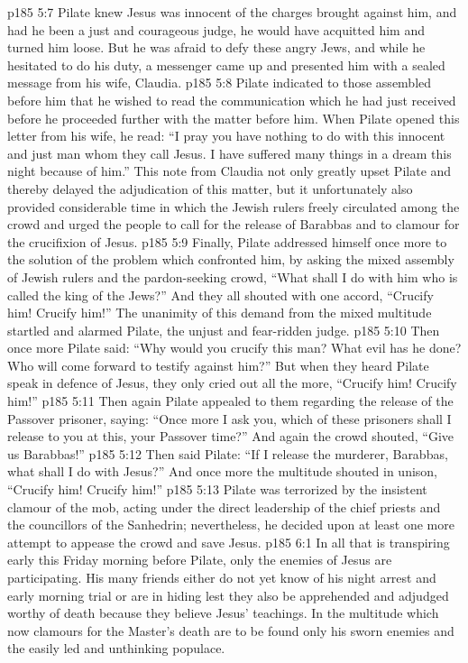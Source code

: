 \vs p185 5:7 Pilate knew Jesus was innocent of the charges brought against him, and had he been a just and courageous judge, he would have acquitted him and turned him loose. But he was afraid to defy these angry Jews, and while he hesitated to do his duty, a messenger came up and presented him with a sealed message from his wife, Claudia.
\vs p185 5:8 Pilate indicated to those assembled before him that he wished to read the communication which he had just received before he proceeded further with the matter before him. When Pilate opened this letter from his wife, he read: “I pray you have nothing to do with this innocent and just man whom they call Jesus. I have suffered many things in a dream this night because of him.” This note from Claudia not only greatly upset Pilate and thereby delayed the adjudication of this matter, but it unfortunately also provided considerable time in which the Jewish rulers freely circulated among the crowd and urged the people to call for the release of Barabbas and to clamour for the crucifixion of Jesus.
\vs p185 5:9 Finally, Pilate addressed himself once more to the solution of the problem which confronted him, by asking the mixed assembly of Jewish rulers and the pardon\hyp{}seeking crowd, “What shall I do with him who is called the king of the Jews?” And they all shouted with one accord, “Crucify him! Crucify him!” The unanimity of this demand from the mixed multitude startled and alarmed Pilate, the unjust and fear\hyp{}ridden judge.
\vs p185 5:10 Then once more Pilate said: “Why would you crucify this man? What evil has he done? Who will come forward to testify against him?” But when they heard Pilate speak in defence of Jesus, they only cried out all the more, “Crucify him! Crucify him!”
\vs p185 5:11 Then again Pilate appealed to them regarding the release of the Passover prisoner, saying: “Once more I ask you, which of these prisoners shall I release to you at this, your Passover time?” And again the crowd shouted, “Give us Barabbas!”
\vs p185 5:12 Then said Pilate: “If I release the murderer, Barabbas, what shall I do with Jesus?” And once more the multitude shouted in unison, “Crucify him! Crucify him!”
\vs p185 5:13 Pilate was terrorized by the insistent clamour of the mob, acting under the direct leadership of the chief priests and the councillors of the Sanhedrin; nevertheless, he decided upon at least one more attempt to appease the crowd and save Jesus.
\vs p185 6:1 In all that is transpiring early this Friday morning before Pilate, only the enemies of Jesus are participating. His many friends either do not yet know of his night arrest and early morning trial or are in hiding lest they also be apprehended and adjudged worthy of death because they believe Jesus’ teachings. In the multitude which now clamours for the Master’s death are to be found only his sworn enemies and the easily led and unthinking populace.

